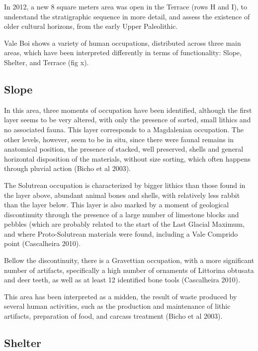 \documentclass[12pt,twoside]{reedthesis}
\begin{document}
In 2012, a new 8 square meters area was open in the Terrace (rows H and I), to understand the stratigraphic sequence in more detail, and assess the existence of older cultural horizons, from the early Upper Paleolithic.

Vale Boi shows a variety of human occupations, distributed across three main areas, which have been interpreted differently in terms of functionality: Slope, Shelter, and Terrace (fig x).

\hypertarget{slope}{%
\subsection{Slope}\label{slope}}

In this area, three moments of occupation have been identified, although the first layer seems to be very altered, with only the presence of sorted, small lithics and no associated fauna. This layer corresponds to a Magdalenian occupation. The other levels, however, seem to be in situ, since there were faunal remains in anatomical position, the presence of stacked, well preserved, shells and general horizontal disposition of the materials, without size sorting, which often happens through pluvial action (Bicho et al 2003).

The Solutrean occupation is characterized by bigger lithics than those found in the layer above, abundant animal bones and shells, with relatively less rabbit than the layer below. This layer is also marked by a moment of geological discontinuity through the presence of a large number of limestone blocks and pebbles (which are probably related to the start of the Last Glacial Maximum, and where Proto-Solutrean materials were found, including a Vale Comprido point (Cascalheira 2010).

Bellow the discontinuity, there is a Gravettian occupation, with a more significant number of artifacts, specifically a high number of ornaments of Littorina obtusata and deer teeth, as well as at least 12 identified bone tools (Cascalheira 2010).

This area has been interpreted as a midden, the result of waste produced by several human activities, such as the production and maintenance of lithic artifacts, preparation of food, and carcass treatment (Bicho et al 2003).

\hypertarget{shelter}{%
\subsection{Shelter}\label{shelter}}
\end{document}
